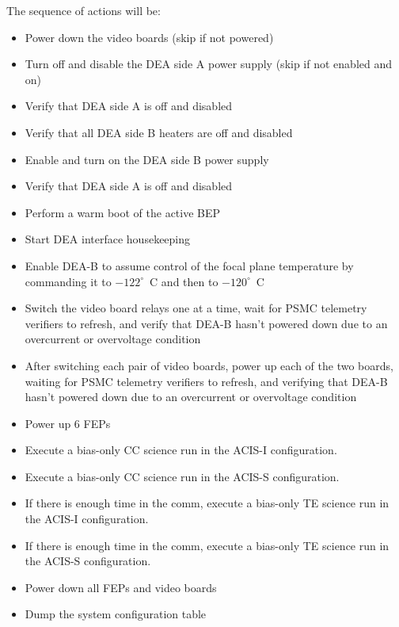 \documentclass[11pt]{article}
\begin{document}
\noindent The sequence of actions will be:
\begin{itemize}
\item Power down the video boards (skip if not powered)
\vspace{-0.10in}
\item Turn off and disable the DEA side A power supply (skip if not enabled and on)
\vspace{-0.10in}
\item Verify that DEA side A is off and disabled
\vspace{-0.10in}
\item Verify that all DEA side B heaters are off and disabled
\vspace{-0.10in}
\item Enable and turn on the DEA side B power supply
\vspace{-0.10in}
\item Verify that DEA side A is off and disabled
\vspace{-0.10in}
\item Perform a warm boot of the active BEP
\vspace{-0.10in}
\item Start DEA interface housekeeping
\vspace{-0.10in}
\item Enable DEA-B to assume control of the focal plane temperature
by commanding it to $-122^\circ$~C and then to $-120^\circ$~C
\vspace{-0.10in}
\item Switch the video board relays one at a time,
wait for PSMC telemetry verifiers to refresh,
and verify that DEA-B hasn't powered down due to an overcurrent
or overvoltage condition
\vspace{-0.10in}
\item After switching each pair of video boards,
power up each of the two boards, waiting for PSMC telemetry verifiers to 
refresh, and verifying that DEA-B hasn't powered down due to an overcurrent
or overvoltage condition
\vspace{-0.10in}
\item Power up 6 FEPs
\vspace{-0.10in}
\item Execute a bias-only CC science run in the ACIS-I configuration.
\vspace{-0.10in}
\item Execute a bias-only CC science run in the ACIS-S configuration.
\vspace{-0.10in}
\item If there is enough time in the comm, execute a bias-only TE science run in the ACIS-I configuration.
\vspace{-0.10in}
\item If there is enough time in the comm, execute a bias-only TE science run in the ACIS-S configuration.
\vspace{-0.10in}
\item Power down all FEPs and video boards
\vspace{-0.10in}
\item Dump the system configuration table
\end{itemize}
\end{document}
